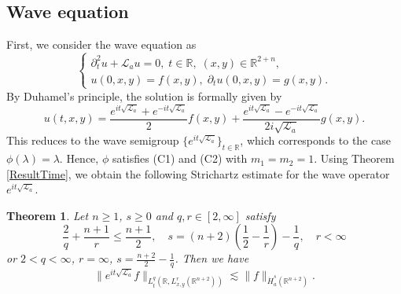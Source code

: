 \documentclass[a4paper,11pt, reqno]{amsart}
\numberwithin{equation}{section}
\theoremstyle{plain}
\newtheorem{theorem}{Theorem}[section]
\theoremstyle{definition}
\theoremstyle{remark}
\begin{document}
\subsection{Wave equation}
First, we consider the wave equation as
\begin{equation}\label{Wave-equ}
	\begin{cases}
	\partial_t^2u+\mathcal{L}_a u=0,\;t\in\mathbb{R},\; (x,y)\in\mathbb{R}^{2+n},\\
	u(0,x,y)=f(x,y),\; \partial_tu(0,x,y)=g(x,y).
	\end{cases}
	\end{equation}
By Duhamel's principle, the solution is formally given by
\begin{equation*}
	u(t,x,y)=\frac{e^{it\sqrt{\mathcal{L}_a}}+e^{-it\sqrt{\mathcal{L}_a}}}{2}f(x,y)+\frac{e^{it\sqrt{\mathcal{L}_a}}-e^{-it\sqrt{\mathcal{L}_a}}}{2i\sqrt{\mathcal{L}_a}}g(x,y).
	\end{equation*}
This reduces to the wave semigroup $\{e^{it\sqrt{\mathcal{L}_a}}\}_{t\in\mathbb{R}}$, which corresponds to the case $\phi(\lambda)=\lambda$. Hence, $\phi$ satisfies (C1) and (C2) with $m_1=m_2=1$.  Using Theorem \ref{ResultTime}, we obtain the  following Strichartz estimate for the wave operator $e^{it\sqrt{\mathcal{L}_a}}$. 
\begin{theorem}\label{Intermediate-wave}  Let $n\geq1$, $s\geq0$ and $q,r\in [2,\infty]$ satisfy
\begin{equation*}
\frac{2}{q}+\frac{n+1}{r}\leq \frac{n+1}{2},\quad s=(n+2)\left(\frac{1}{2}-\frac{1}{r}\right)-\frac{1}{q}, \quad r<\infty
\end{equation*}
or $2<q<\infty$, $r=\infty$, $s=\frac{n+2}{2}-\frac{1}{q}$. Then we have
\begin{equation*}
\|e^{it\sqrt{\mathcal{L}_a}}f\|_{L_t^q(\mathbb{R},L^r_{x,y}(\mathbb{R}^{n+2}))}\lesssim \|f\|_{\dot{H}^s_a(\mathbb{R}^{n+2})}.
\end{equation*}
\end{theorem}
\end{document}
